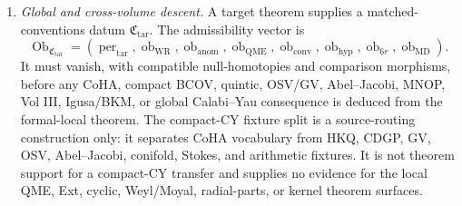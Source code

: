 \begin{enumerate}
  \item \emph{Global and cross-volume descent.}
  A target theorem supplies a matched-conventions datum
  \(\mathfrak C_{\mathrm{tar}}\).  The admissibility vector is
  \[
    \operatorname{Ob}_{\mathfrak C_{\mathrm{tar}}}
    =
	    (\operatorname{per}_{\mathrm{tar}},
	     \operatorname{ob}_{\mathrm{WR}},
	     \operatorname{ob}_{\mathrm{anom}},
	     \operatorname{ob}_{\mathrm{QME}},
	     \operatorname{ob}_{\mathrm{conv}},
	     \operatorname{ob}_{\mathrm{hyp}},
	     \operatorname{ob}_{6r},
	     \operatorname{ob}_{\mathrm{MD}}).
  \]
  It must vanish, with compatible null-homotopies and comparison
  morphisms, before any CoHA, compact BCOV, quintic, OSV/GV,
  Abel--Jacobi, MNOP, Vol III, Igusa/BKM, or global Calabi--Yau
  consequence is deduced from the formal-local theorem.  The compact-CY
  fixture split is a source-routing construction only: it separates CoHA
  vocabulary from HKQ, CDGP, GV, OSV, Abel--Jacobi, conifold, Stokes, and
  arithmetic fixtures.  It is not theorem support for a compact-CY
  transfer and supplies no evidence for the local QME, Ext, cyclic,
  Weyl/Moyal, radial-parts, or kernel theorem surfaces.
\end{enumerate}

\endgroup
